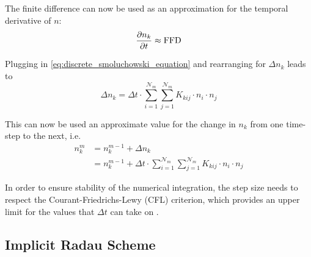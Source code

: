         The finite difference can now be used as an approximation for the temporal derivative 
        of $n$:
        \begin{equation}
            \frac{\partial n_k}{\partial t}
                \approx\text{FFD}
        \end{equation}
        
        Plugging in \cref{eq:discrete_smoluchowski_equation} and rearranging for $\Delta n_k$ 
        leads to
        \begin{equation}
            \Delta n_k
            =\Delta t\cdot
                \sum_{i=1}^{\mathcal N_m}\sum_{j=1}^{\mathcal N_m}
                K_{kij}\cdot n_i\cdot n_j
        \end{equation}
        
        This can now be used an approximate value for the change in $n_k$ from one time-step to 
        the next, i.e.
        \begin{equation}
            \begin{split}
                n_k^m
                    &=n_k^{m-1}+\Delta n_k
                \\
                    &=n_k^{m-1}+\Delta t\cdot
                        \sum_{i=1}^{\mathcal N_m}\sum_{j=1}^{\mathcal N_m}
                        K_{kij}\cdot n_i\cdot n_j
            \end{split}
        \end{equation}
        
        In order to ensure stability of the numerical integration, the step size needs to respect the 
        Courant-Friedrichs-Lewy (CFL) criterion, which provides an upper limit for the values that 
        $\Delta t$ can take on \cite{courant_friedrichs_lewy_1928}.\\
        

    \subsection{Implicit Radau Scheme}

         \\
         \\

         \\
         \\

         \\
         \\

